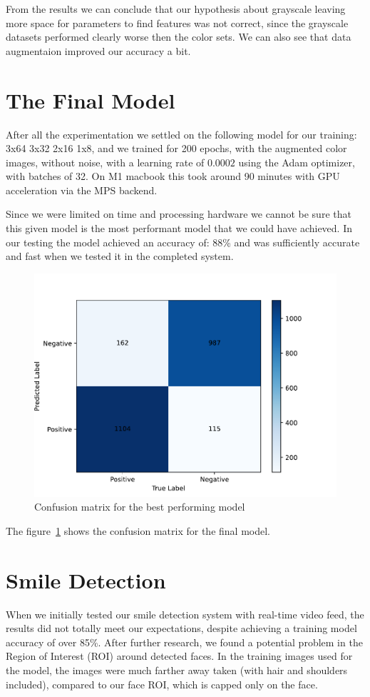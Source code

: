 \documentclass[12pt,a4paper,english
]{tunithesis}
\begin{document}
From the results we can conclude that our hypothesis about grayscale leaving more space for parameters to find features was not correct, since the grayscale datasets performed clearly worse then the color sets. We can also see that data augmentaion improved our accuracy a bit.

\section{The Final Model}
After all the experimentation we settled on the following model for our training: 3x64 3x32 2x16 1x8, and we trained for 200 epochs, with the augmented color images, without noise, with a learning rate of $0.0002$ using the Adam optimizer, with batches of 32. On M1 macbook this took around 90 minutes with GPU acceleration via the MPS backend.

Since we were limited on time and processing hardware we cannot be sure that this given model is the most performant model that we could have achieved. In our testing the model achieved an accuracy of: 88\% and was sufficiently accurate and fast when we tested it in the completed system.

\begin{figure}
  \centering
  \includegraphics[width=\columnwidth]{img/confusion_matrix_best.pdf}
  \caption{Confusion matrix for the best performing model}
  \label{fig:confusion_matrix_best}
\end{figure}

The figure~\ref{fig:confusion_matrix_best} shows the confusion matrix for the final model.

\section{Smile Detection}
When we initially tested our smile detection system with real-time video feed, the results did not totally meet our expectations, despite achieving a training model accuracy of over 85\%. After further research, we found a potential problem in the Region of Interest (ROI) around detected faces. In the training images used for the model, the images were much farther away taken (with hair and shoulders included), compared to our face ROI, which is capped only on the face.  
\end{document}
